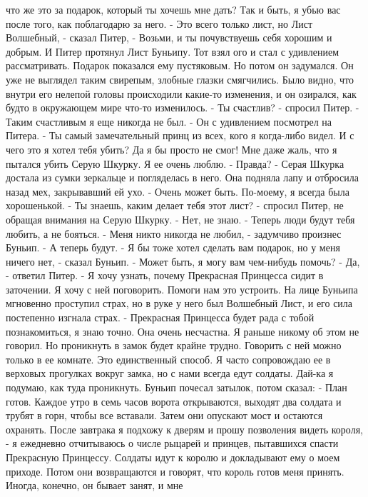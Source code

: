 что же это за подарок, который ты хочешь мне дать? Так и быть, я убью 
вас после того, как поблагодарю за него.
    - Это всего только лист, но Лист Волшебный, - сказал Питер, - 
Возьми, и ты почувствуешь себя хорошим и добрым.
    И Питер протянул Лист Буньипу.
    Тот взял ого и стал с удивлением рассматривать. Подарок показался 
ему пустяковым. Но потом он задумался. Он уже не выглядел таким 
свирепым, злобные глазки смягчились. Было видно, что внутри его 
нелепой головы происходили какие-то изменения, и он озирался, как 
будто в окружающем мире что-то изменилось.
    - Ты счастлив? - спросил Питер.
    - Таким счастливым я еще никогда не был. - Он с удивлением 
посмотрел на Питера. - Ты самый замечательный принц из всех, кого я 
когда-либо видел. И с чего это я хотел тебя убить? Да я бы просто не 
смог! Мне даже жаль, что я пытался убить Серую Шкурку. Я ее очень 
люблю.
    - Правда? - Серая Шкурка достала из сумки зеркальце и погляделась 
в него. Она подняла лапу и отбросила назад мех, закрывавший ей ухо. - 
Очень может быть. По-моему, я всегда была хорошенькой.
    - Ты знаешь, каким делает тебя этот лист? - спросил Питер, не 
обращая внимания на Серую Шкурку.
    - Нет, не знаю.
    - Теперь люди будут тебя любить, а не бояться.
    - Меня никто никогда не любил, - задумчиво произнес Буньип.
    - А теперь будут.
    - Я бы тоже хотел сделать вам подарок, но у меня ничего нет, - 
сказал Буньип. - Может быть, я могу вам чем-нибудь помочь?
    - Да, - ответил Питер. - Я хочу узнать, почему Прекрасная 
Принцесса сидит в заточении. Я хочу с ней поговорить. Помоги нам это 
устроить.
    На лице Буньипа мгновенно проступил страх, но в руке у него был 
Волшебный Лист, и его сила постепенно изгнала страх.
    - Прекрасная Принцесса будет рада с тобой познакомиться, я знаю 
точно. Она очень несчастна. Я раньше никому об этом не говорил. Но 
проникнуть в замок будет крайне трудно. Говорить с ней можно только в 
ее комнате. Это единственный способ. Я часто сопровождаю ее в верховых 
прогулках вокруг замка, но с нами всегда едут солдаты. Дай-ка я 
подумаю, как туда проникнуть.
    Буньип почесал затылок, потом сказал:
    - План готов. Каждое утро в семь часов ворота открываются, выходят 
два солдата и трубят в горн, чтобы все вставали. Затем они опускают 
мост и остаются охранять. После завтрака я подхожу к дверям и прошу 
позволения видеть короля, - я ежедневно отчитываюсь о числе рыцарей и 
принцев, пытавшихся спасти Прекрасную Принцессу. Солдаты идут к королю 
и докладывают ему о моем приходе. Потом они возвращаются и говорят, 
что король готов меня принять. Иногда, конечно, он бывает занят, и мне 
